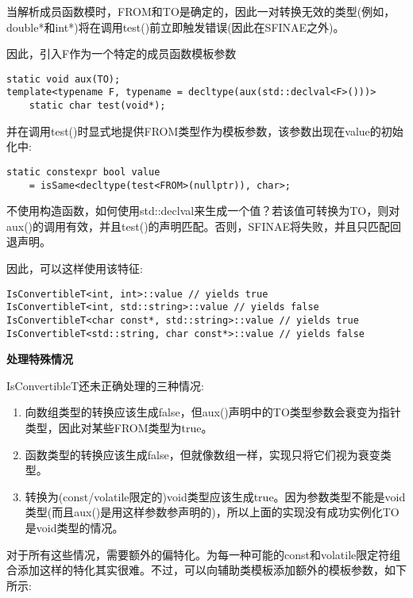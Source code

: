 当解析成员函数模时，FROM和TO是确定的，因此一对转换无效的类型(例如，double*和int*)将在调用test()前立即触发错误(因此在SFINAE之外)。

因此，引入F作为一个特定的成员函数模板参数

\begin{lstlisting}[style=styleCXX]
static void aux(TO);
template<typename F, typename = decltype(aux(std::declval<F>()))>
	static char test(void*);
\end{lstlisting}

并在调用test()时显式地提供FROM类型作为模板参数，该参数出现在value的初始化中:

\begin{lstlisting}[style=styleCXX]
static constexpr bool value
	= isSame<decltype(test<FROM>(nullptr)), char>;
\end{lstlisting}

不使用构造函数，如何使用std::declval来生成一个值？若该值可转换为TO，则对aux()的调用有效，并且test()的声明匹配。否则，SFINAE将失败，并且只匹配回退声明。

因此，可以这样使用该特征:

\begin{lstlisting}[style=styleCXX]
IsConvertibleT<int, int>::value // yields true
IsConvertibleT<int, std::string>::value // yields false
IsConvertibleT<char const*, std::string>::value // yields true
IsConvertibleT<std::string, char const*>::value // yields false
\end{lstlisting}

\noindent
\textbf{处理特殊情况}

IsConvertibleT还未正确处理的三种情况:

\begin{enumerate}
\item
向数组类型的转换应该生成false，但aux()声明中的TO类型参数会衰变为指针类型，因此对某些FROM类型为true。

\item
函数类型的转换应该生成false，但就像数组一样，实现只将它们视为衰变类型。

\item
转换为(const/volatile限定的)void类型应该生成true。因为参数类型不能是void类型(而且aux()是用这样参数参声明的)，所以上面的实现没有成功实例化TO是void类型的情况。
\end{enumerate}

对于所有这些情况，需要额外的偏特化。为每一种可能的const和volatile限定符组合添加这样的特化其实很难。不过，可以向辅助类模板添加额外的模板参数，如下所示:

